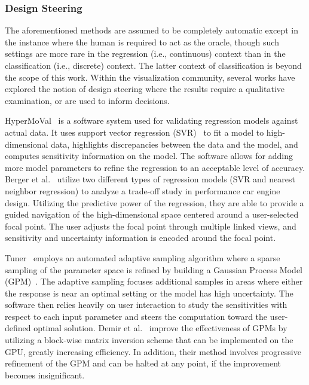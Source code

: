 
\subsubsection{Design Steering}

The aforementioned methods are assumed to be completely automatic except in the instance where the human is required to act as the oracle, though such settings are more rare in the regression (i.e., continuous) context than in the classification (i.e., discrete) context.
%
The latter context of classification is beyond the scope of this work.
%
%
Within the visualization community, several works have explored the notion of design steering where the results require a qualitative examination, or are used to inform decisions.

HyperMoVal~\cite{PiringerBergerKrasser2010} is a software system used for validating regression models against actual data.
%
It uses support vector regression (SVR)~\cite{SmolaScholkopf2004} to fit a model to high-dimensional data, highlights discrepancies between the data and the model, and computes sensitivity information on the model.
%
The software allows for adding more model parameters to refine the regression to an acceptable level of accuracy.
%
Berger et al.~\cite{BergerPiringerFilzmoser2011} utilize two different types of regression models (SVR and nearest neighbor regression) to analyze a trade-off study in performance car engine design.
%
Utilizing the predictive power of the regression, they are able to provide a guided navigation of the high-dimensional space centered around a user-selected focal point.
%
The user adjusts the focal point through multiple linked views, and sensitivity and uncertainty information is encoded around the focal point.

Tuner~\cite{Torsney-WeirSaadMoller2011} employs an automated adaptive sampling algorithm where a sparse sampling of the parameter space is refined by building a Gaussian Process Model (GPM)~\cite{RasmussenWilliams2006}.
%
The adaptive sampling focuses additional samples in areas where either the response is near an optimal setting or the model has high uncertainty.
%
The software then relies heavily on user interaction to study the sensitivities with respect to each input parameter and steers the computation toward the user-defined optimal solution.
%
Demir et al.~\cite{DemirWestermann2013} improve the effectiveness of GPMs by utilizing a block-wise matrix inversion scheme that can be implemented on the GPU, greatly increasing efficiency.
%
In addition, their method involves progressive refinement of the GPM and can be halted at any point, if the improvement becomes insignificant.

